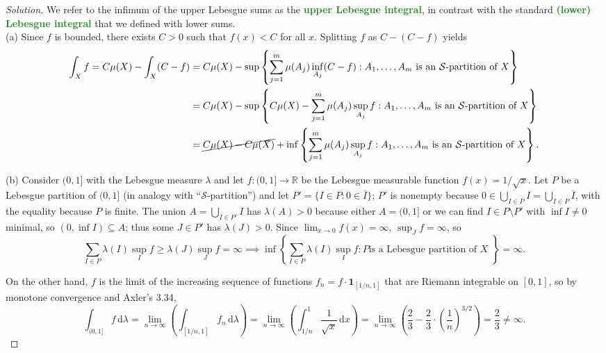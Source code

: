 \documentclass[10pt]{article}
\providecommand{\ol}{\overline}
\newcommand{\dd}{\,\mathrm{d}}
\providecommand{\RR}{\mathbb R}
\newenvironment{soln}{\begin{proof}[Solution]}{\end{proof}}
\providecommand{\vocab}[1]{{\textbf{\textcolor{ForestGreen}{#1}}}}
\begin{document}
\begin{soln}
    We refer to the infimum of the upper Lebesgue sums
    as the \vocab{upper Lebesgue integral}, in contrast with
    the standard \vocab{(lower) Lebesgue integral} that we defined with lower sums.
    \\

    (a) Since $f$ is bounded, there exists $C > 0$
    such that $f(x) < C$ for all $x$. Splitting $f$ as $C - (C-f)$ yields
    \begin{align*}
	\int_Xf
	= C\mu(X) - \int_X(C-f)
	&= C\mu(X) - \sup\left\{ \sum_{j=1}^m \mu(A_j)\inf_{A_j}(C-f) :
	A_1,\dots,A_m\text{ is an $\mathcal S$-partition of $X$}\right\}\\
	&= C\mu(X) - \sup\left\{ C\mu(X) - \sum_{j=1}^m \mu(A_j)\sup_{A_j}f :
	A_1,\dots,A_m\text{ is an $\mathcal S$-partition of $X$}\right\}\\
	&= \cancel{C\mu(X) - C\mu(X)}
	+ \inf\left\{ \sum_{j=1}^m \mu(A_j)\sup_{A_j}f :
	A_1,\dots,A_m\text{ is an $\mathcal S$-partition of $X$}\right\}.
    \end{align*}

    (b) Consider $(0,1]$ with the Lebesgue measure $\lambda$
    and let $f\colon (0,1]\to\RR$ be the Lebesgue measurable function
    $f(x) = 1/\sqrt x$. Let $P$ be a Lebesgue partition of $(0,1]$
    (in analogy with ``$\mathcal S$-partition'') and
    let $P' = \{I \in P : 0\in\ol I\}$;
    $P'$ is nonempty because $0\in \ol{\bigcup_{I\in P}I} = \bigcup_{I\in P} \ol I$,
    with the equality because $P$ is finite.
    The union $A = \bigcup_{I\in P'} I$ has $\lambda(A) > 0$
    because either $A = (0,1]$ or we can find
    $I\in P\setminus P'$ with $\inf I\ne0$ minimal, so $(0,\inf I)\subseteq A$;
    thus some $J\in P'$ has $\lambda(J) > 0$.
    Since $\lim_{x\to0}f(x) = \infty$, $\sup_Jf=\infty$, so
    \begin{equation*}
	\sum_{I\in P} \lambda(I)\sup_{I}f
	\ge \lambda(J)\sup_{J}f = \infty
	\implies \inf\left\{
	    \sum_{I\in P} \lambda(I)\sup_{I}f : P\text{
		is a Lebesgue partition of $X$
	    }
	\right\} = \infty.
    \end{equation*}

    On the other hand, $f$ is the limit of the increasing sequence of functions
    $f_n = f\cdot\mathbf 1_{[1/n,1]}$ that are Riemann integrable on $[0,1]$,
    so by monotone convergence and Axler's 3.34,
    \begin{equation*}
	\int_{(0,1]} f\dd\lambda =
	\lim_{n\to\infty}\left(\int_{[1/n,1]} f_n\dd\lambda\right) =
	\lim_{n\to\infty}\left(\int_{1/n}^1 \frac1{\sqrt x}\dd x\right) =
	\lim_{n\to\infty} \left(\frac 23 -
	\frac 23\cdot\left(\frac 1n\right)^{3/2}\right) = \frac 23\ne\infty.
    \end{equation*}


\end{soln}
\end{document}
